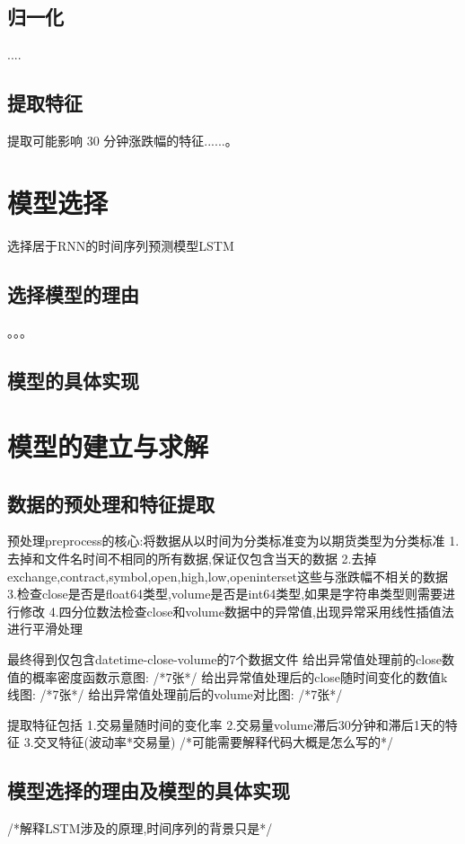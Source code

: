 \documentclass[a4paper,12pt]{ctexart}
\begin{document}
\subsection{归一化}
....
\subsection{提取特征}
提取可能影响 30 分钟涨跌幅的特征......。




\section{模型选择}
选择居于RNN的时间序列预测模型LSTM
\subsection{选择模型的理由}
。。。
\subsection{模型的具体实现}



\newpage
\section{模型的建立与求解}
\subsection{数据的预处理和特征提取}


预处理preprocess的核心:将数据从以时间为分类标准变为以期货类型为分类标准
1.去掉和文件名时间不相同的所有数据,保证仅包含当天的数据
2.去掉exchange,contract,symbol,open,high,low,openinterset这些与涨跌幅不相关的数据
3.检查close是否是float64类型,volume是否是int64类型,如果是字符串类型则需要进行修改
4.四分位数法检查close和volume数据中的异常值,出现异常采用线性插值法进行平滑处理

最终得到仅包含datetime-close-volume的7个数据文件
给出异常值处理前的close数值的概率密度函数示意图:
/*7张*/
给出异常值处理后的close随时间变化的数值k线图:
/*7张*/
给出异常值处理前后的volume对比图:
/*7张*/


提取特征包括 1.交易量随时间的变化率 2.交易量volume滞后30分钟和滞后1天的特征 3.交叉特征(波动率*交易量)
/*可能需要解释代码大概是怎么写的*/

\subsection{模型选择的理由及模型的具体实现}
/*解释LSTM涉及的原理,时间序列的背景只是*/
\end{document}
